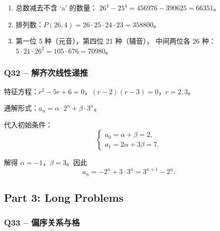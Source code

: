 \documentclass[11pt,a4paper,fontset=mac]{ctexart}
\begin{document}
\begin{enumerate}[label=(\alph*)]
  \item 总数减去不含 `a' 的数量：
    $26^{4} - 25^{4} = 456976 - 390625 = 66351$。
  \item 排列数：$P(26,4)=26\cdot25\cdot24\cdot23=358800$。
  \item 第一位 5 种（元音），第四位 21 种（辅音），
    中间两位各 $26$ 种：$5\cdot21\cdot26^{2}=105\cdot676=70980$。
\end{enumerate}

\subsubsection*{Q32 \;--\; 解齐次线性递推}

特征方程：$r^{2}-5r+6=0$，$(r-2)(r-3)=0$，$r=2,3$。

通解形式：$a_n = \alpha\cdot2^{n} + \beta\cdot3^{n}$。

代入初始条件：
\[
\begin{cases}
a_0 = \alpha + \beta = 2,\\[2pt]
a_1 = 2\alpha + 3\beta = 7.
\end{cases}
\]

解得 $\alpha=-1$，$\beta=3$。因此
\[
a_n = -2^{n} + 3\cdot3^{n} = 3^{n+1} - 2^{n}.
\]

\subsection*{Part 3: Long Problems}

\subsubsection*{Q33 \;--\; 偏序关系与格}
\end{document}
